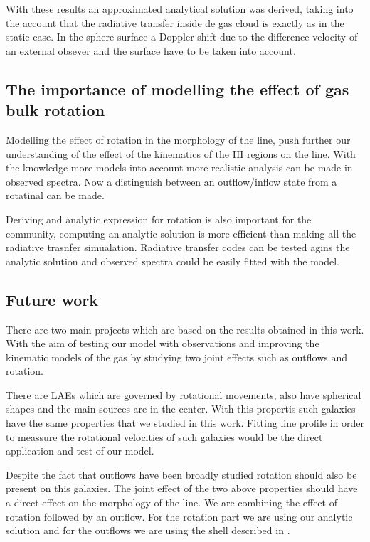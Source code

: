  
With these results an approximated analytical solution was derived, 
taking into the account that the radiative transfer inside de gas
cloud is exactly as in the static case. In the sphere surface
a Doppler shift due to the difference velocity of an external 
obsever and the surface have to be taken into account.  


\subsection{The importance of modelling the effect of gas bulk rotation}

Modelling the effect of rotation in the morphology of the \ly line, push 
further our understanding of the effect of the kinematics of the HI regions
on the line. With the knowledge more models into account more realistic analysis 
can be made in observed \ly spectra. Now a distinguish between an 
outflow/inflow state from a rotatinal can be made.  

Deriving and analytic expression for rotation is also important for 
the community, computing an analytic solution is more efficient than 
making all the radiative trasnfer simualation. Radiative transfer codes 
can be tested agins the analytic solution and observed spectra could 
be easily fitted  with the model. 

\subsection{Future work}

There are two main projects which are based on the results obtained in 
this work. With the aim of testing our model with observations and
improving the kinematic models of the gas by studying two joint effects
such as outflows and rotation.  

There are LAEs which are governed by rotational movements, also 
have spherical shapes and the main \ly sources are in the center. 
With this propertis such galaxies have the same properties 
that we studied in this work.  
Fitting \ly line profile in order  to meassure the rotational 
velocities of such galaxies would be the direct application 
and test of our model.

Despite the fact that outflows have been broadly studied rotation should 
also be present on this galaxies. The joint effect of the two above properties 
should have a direct effect on the morphology of the \lya line. We are 
 combining the effect of rotation followed by an outflow. For the rotation 
part we are using our analytic solution and for the outflows we are using 
the shell described in \citep{Verhamme06}.



